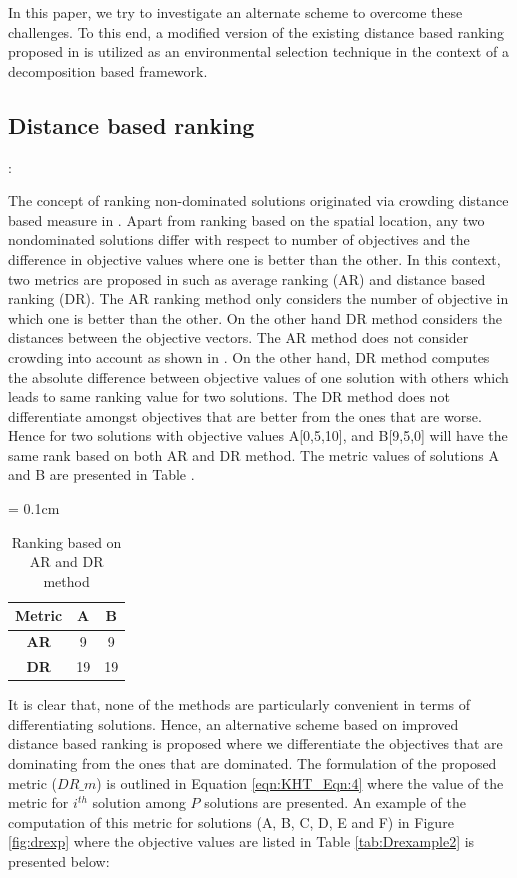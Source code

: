 \documentclass{sig-alternate}
\begin{document}
In this paper, we try to investigate an alternate scheme to overcome these challenges. To this end, a modified version of the existing distance based ranking proposed in \cite{mostaghim2008} is utilized as an environmental selection technique in the context of a decomposition based framework. 

\subsection{Distance based ranking}: 

The concept of ranking non-dominated solutions originated via crowding distance based measure in \cite{deb2002fast}. Apart from ranking based on the spatial location, any two nondominated solutions differ with respect to number of objectives and the difference in objective values where one is better than the other. In this context, two metrics are proposed in \cite{mostaghim2008} such as average ranking (AR) and distance based ranking (DR). The AR ranking method only considers the number of objective in which one is better than the other. On  the other hand DR method considers the distances between the objective vectors. The AR method does not consider crowding into account as shown in \cite{mostaghim2008}. On the other hand, DR method computes the absolute difference between objective values of one solution with others which leads to same ranking value for two solutions. The DR method does not differentiate amongst objectives that are better from the ones that are worse. Hence for two solutions with objective values A[0,5,10], and B[9,5,0] will have the same rank based on both AR and DR method. The metric values of solutions A and B are presented in Table . 

	\begin{table}[!htb]\scriptsize
		\centering
		\renewcommand{\arraystretch}{0.9}
		\caption{Ranking based on AR and DR method}
		\label{tab:Drexample1}
		\tabcolsep = 0.1cm
		\begin{tabular}{|c|c|c|}
		\hline
		\textbf{Metric} & \textbf{A} & \textbf{B} \\ \hline
		\textbf{AR}     & 9          & 9          \\ \hline
		\textbf{DR}     & 19         & 19         \\ \hline
		\end{tabular}
	\end{table} 
	
It is clear that, none of the methods are particularly convenient in terms of differentiating solutions. Hence, an alternative scheme based on improved distance based ranking is proposed where we differentiate the objectives that are dominating from the ones that are dominated. The formulation of the proposed metric ($DR\_m$) is outlined in Equation \ref{eqn:KHT_Eqn:4} where the value of the metric for $i^{th}$ solution among $P$ solutions are presented. An example of the computation of this metric for solutions (A, B, C, D, E and F) in Figure \ref{fig:drexp} where the objective values are listed in Table \ref{tab:Drexample2} is presented below: 
\end{document}
